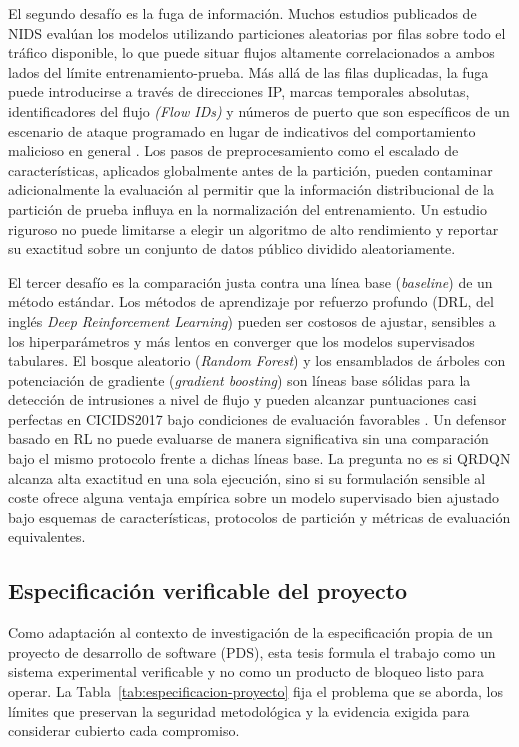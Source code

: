 El segundo desafío es la fuga de información. Muchos estudios publicados de NIDS evalúan los modelos utilizando particiones aleatorias por filas sobre todo el tráfico disponible, lo que puede situar flujos altamente correlacionados a ambos lados del límite entrenamiento-prueba. Más allá de las filas duplicadas, la fuga puede introducirse a través de direcciones IP, marcas temporales absolutas, identificadores del flujo \textit{(Flow IDs)} y números de puerto que son específicos de un escenario de ataque programado en lugar de indicativos del comportamiento malicioso en general \parencite{Arp2020DosDontsMLSecurity,Kaufman2011LeakageDataMining}. Los pasos de preprocesamiento como el escalado de características, aplicados globalmente antes de la partición, pueden contaminar adicionalmente la evaluación al permitir que la información distribucional de la partición de prueba influya en la normalización del entrenamiento. Un estudio riguroso no puede limitarse a elegir un algoritmo de alto rendimiento y reportar su exactitud sobre un conjunto de datos público dividido aleatoriamente.

El tercer desafío es la comparación justa contra una línea base (\emph{baseline}) de un método estándar. Los métodos de aprendizaje por refuerzo profundo (DRL, del inglés \emph{Deep Reinforcement Learning}) pueden ser costosos de ajustar, sensibles a los hiperparámetros y más lentos en converger que los modelos supervisados tabulares. El bosque aleatorio (\emph{Random Forest}) y los ensamblados de árboles con potenciación de gradiente (\emph{gradient boosting}) son líneas base sólidas para la detección de intrusiones a nivel de flujo y pueden alcanzar puntuaciones casi perfectas en CICIDS2017 bajo condiciones de evaluación favorables \parencite{LiuLang2019IDSSurvey,Apruzzese2022CrossEvaluationNIDS}. Un defensor basado en RL no puede evaluarse de manera significativa sin una comparación bajo el mismo protocolo frente a dichas líneas base. La pregunta no es si QRDQN alcanza alta exactitud en una sola ejecución, sino si su formulación sensible al coste ofrece alguna ventaja empírica sobre un modelo supervisado bien ajustado bajo esquemas de características, protocolos de partición y métricas de evaluación equivalentes.

\subsection{Especificación verificable del proyecto}
\label{sec:especificacion-proyecto}
Como adaptación al contexto de investigación de la especificación propia de un proyecto de desarrollo de software (PDS), esta tesis formula el trabajo como un sistema experimental verificable y no como un producto de bloqueo listo para operar. La Tabla~\ref{tab:especificacion-proyecto} fija el problema que se aborda, los límites que preservan la seguridad metodológica y la evidencia exigida para considerar cubierto cada compromiso.

